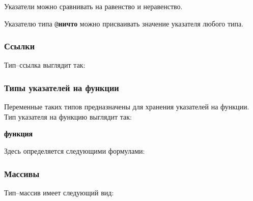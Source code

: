 \documentclass[10pt]{report}
\begin{document}
Указатели можно сравнивать на равенство и неравенство. 

Указателю типа \texttt{@}\textbf{ничто} можно присваивать значение указателя любого типа.

        \subsubsection{Ссылки}
Тип--ссылка выглядит так:        
\begin{center}
\noindent\textcolor{Green}{}
\end{center}
        
        \subsubsection{Типы указателей на функции}

Переменные таких типов предназначены для хранения указателей на функции. Тип указателя на функцию выглядит так:
\begin{center}
\noindent\textcolor{Green}{\textcolor{Black}{\textbf{функция}}  }
\end{center}

Здесь \textcolor{Green}{} определяется следующими формулами:

\textcolor{Green}{}

        \subsubsection{Массивы}
Тип--массив имеет следующий вид:
\begin{center}
\noindent\textcolor{Green}{}
\end{center}
\end{document}
